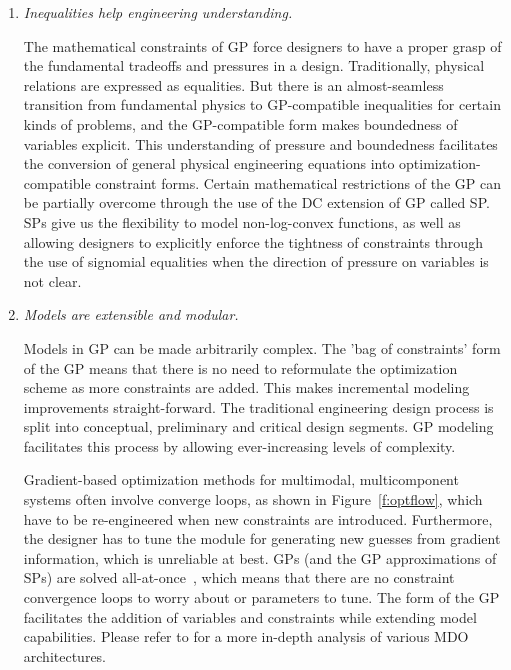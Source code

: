 \begin{enumerate}

    \item \textit{Inequalities help engineering understanding.}

    The mathematical constraints of \gls{GP} force designers to have a proper grasp
    of the fundamental tradeoffs and pressures in a design.
    Traditionally, physical relations are expressed as equalities. But there is an
    almost-seamless transition from fundamental physics to GP-compatible
    inequalities for certain kinds of problems, and the \gls{GP}-compatible
    form makes boundedness of variables explicit. This understanding of pressure
    and boundedness facilitates the conversion of general physical engineering
    equations into optimization-compatible constraint forms.
    Certain mathematical restrictions of the \gls{GP} can be partially
    overcome through the use of the \gls{DC}
    extension of \gls{GP} called \gls{SP}. \gls{SP}s give us the flexibility to model
    non-log-convex functions, as well as allowing designers to explicitly enforce
    the tightness of
    constraints through the use of signomial equalities when the direction of pressure
    on variables is not clear.

    \item \textit{Models are extensible and modular.}

    Models in \gls{GP} can be made arbitrarily complex. The 'bag of constraints' form of the \gls{GP}
    means that there is no need to reformulate the optimization scheme as more
    constraints are added. This makes incremental modeling improvements straight-forward.
    The traditional engineering design process is split into conceptual, preliminary
    and critical design segments. \gls{GP} modeling facilitates this process by allowing
    ever-increasing levels of complexity.

    Gradient-based optimization methods for
    multimodal, multicomponent systems often involve
    converge loops, as shown in Figure~\ref{f:optflow}, which have to be re-engineered
    when new constraints are introduced. Furthermore, the designer has to tune
    the module for generating new guesses from gradient information, which is unreliable
    at best. \gls{GP}s (and the \gls{GP} approximations
    of \gls{SP}s) are solved all-at-once~\cite{martins_mdo}, which means that there are no constraint
    convergence loops to worry about or parameters to tune. The
    form of the GP facilitates the addition of variables and constraints while extending
    model capabilities. Please refer to \cite{martins_mdo}
    for a more in-depth analysis of various \gls{MDO} architectures.


\end{enumerate}

